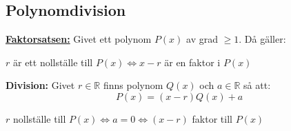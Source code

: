 \subsection{Polynomdivision} %
\label{sub:polynomdivision}
\textbf{\underline{Faktorsatsen:}} Givet ett polynom $P(x)$ av grad $\ge 1$. Då gäller:
\begin{center}
    $r$ är ett nollställe till $P(x) \Longleftrightarrow x -r$ är en faktor i $P(x)$
\end{center}
\textbf{Division:} Givet $r \in \mathbb{R}$ finns polynom $Q(x)$ och $a \in \mathbb{R}$ så att:
\[
P(x) = (x-r)Q(x) + a
\]
\begin{center}
    $r$ nollställe till $P(x) \Longleftrightarrow a = 0 \Longleftrightarrow (x - r)$ faktor till $P(x)$
\end{center}

























